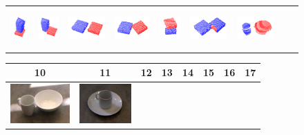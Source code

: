\begin{figure}[h!]
\begin{tabular}{ccccccccc}
    \includegraphics[height=1.5cm]{pictures/33.png}&
    \includegraphics[height=1.5cm]{pictures/43.png}&
    \includegraphics[height=1.5cm]{pictures/53.png}&
    \includegraphics[height=1.5cm]{pictures/63.png}&
    \includegraphics[height=1.5cm]{pictures/73.png}&
    \includegraphics[height=1.5cm]{pictures/83.png}&
    \includegraphics[height=1.5cm]{pictures/93.png}\\
    \end{tabular}
      \hspace*{-2.5cm}  
    \begin{tabular}{cccccccc}
      \hline
      10 & 11 & 12 & 13 & 14 & 15 & 16 & 17\\
      \hline
      \hline
    \includegraphics[height=1.5cm]{pictures/101.jpg}&
    \includegraphics[height=1.5cm]{pictures/111.jpg}&

\end{tabular}
\end{figure}
